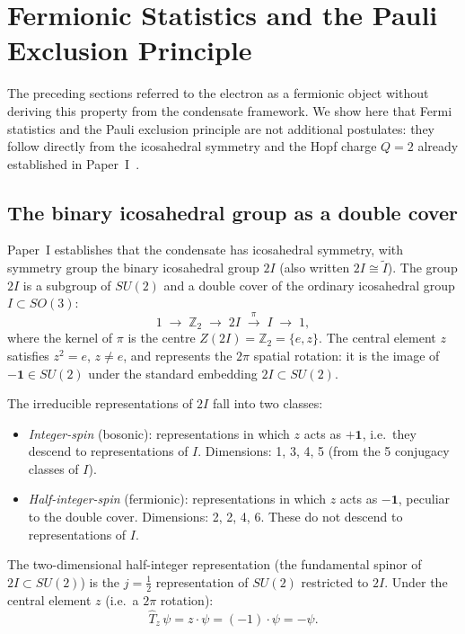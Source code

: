 \documentclass[11pt,a4paper]{article}
\theoremstyle{definition}
\theoremstyle{remark}
\begin{document}
\section{Fermionic Statistics and the Pauli Exclusion Principle}
\label{P13:sec:fermi}

The preceding sections referred to the electron as a fermionic object
without deriving this property from the condensate framework.
We show here that Fermi statistics and the Pauli exclusion principle
are not additional postulates: they follow directly from the icosahedral
symmetry and the Hopf charge $Q=2$ already established in Paper~I~\cite{Paper1}.

\subsection{The binary icosahedral group as a double cover}
\label{P13:sec:2I_double_cover}

Paper~I establishes that the condensate has icosahedral symmetry,
with symmetry group the binary icosahedral group $2I$ (also written $2I\cong\tilde{I}$).
The group $2I$ is a subgroup of $SU(2)$ and a double cover of the
ordinary icosahedral group $I\subset SO(3)$:
\begin{equation}
  1 \;\longrightarrow\; \mathbb{Z}_2
  \;\longrightarrow\; 2I
  \;\stackrel{\pi}{\longrightarrow}\; I
  \;\longrightarrow\; 1,
  \label{P13:eq:2I_exact_seq}
\end{equation}
where the kernel of $\pi$ is the centre $Z(2I)=\mathbb{Z}_2=\{e,z\}$.
The central element $z$ satisfies $z^2=e$, $z\neq e$, and represents the
$2\pi$ spatial rotation: it is the image of $-\mathbf{1}\in SU(2)$
under the standard embedding $2I\subset SU(2)$.

The irreducible representations of $2I$ fall into two classes:
\begin{itemize}[noitemsep]
  \item \emph{Integer-spin} (bosonic): representations in which
    $z$ acts as $+\mathbf{1}$, i.e.\ they descend to representations
    of $I$.
    Dimensions: 1, 3, 4, 5 (from the 5 conjugacy classes of $I$).
  \item \emph{Half-integer-spin} (fermionic): representations in which
    $z$ acts as $-\mathbf{1}$, peculiar to the double cover.
    Dimensions: 2, 2, 4, 6.
    These do not descend to representations of $I$.
\end{itemize}
The two-dimensional half-integer representation (the fundamental spinor
of $2I\subset SU(2)$) is the $j=\tfrac{1}{2}$ representation of $SU(2)$
restricted to $2I$.
Under the central element $z$ (i.e.\ a $2\pi$ rotation):
\begin{equation}
  \hat{T}_z \,\psi = z\cdot\psi = (-1)\cdot\psi = -\psi.
  \label{P13:eq:z_action}
\end{equation}
\end{document}
